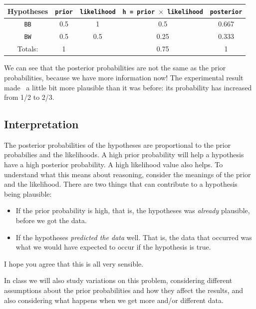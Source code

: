 \begin{table}[h!]
\begin{center}
\begin{tabular}{|c|c|c|c|c|}
\hline
{\bf Hypotheses} & {\tt prior} & {\tt likelihood} &
{\tt h = prior $\times$ likelihood} & {\tt posterior}\\
\hline
{\tt BB} & 0.5 & 1 & 0.5 & 0.667\\
{\tt BW} & 0.5 & 0.5 & 0.25  & 0.333\\
\hline
Totals: & 1 & & 0.75 & 1\\
\hline
\end{tabular}
\end{center}
\end{table}
We can see that the posterior probabilities are not the same as the prior
probabilities, because we have more information now! The experimental result
made \bb~a little bit more plausible than it was before: its probability has
increased from 1/2 to 2/3.

\subsection{Interpretation}
The posterior probabilities of the hypotheses are proportional to the prior probabilies
and the likelihoods. A high prior probability will help a hypothesis have a high
posterior probability. A high likelihood value also helps.
To understand what this means about reasoning, consider
the meanings of the prior and the likelihood. There are two things that can
contribute to a hypothesis being plausible:
\begin{itemize}
\item If the prior probability is high, that is, the hypotheses was {\it already}
plausible, before we got the data.
\item If the hypotheses {\it predicted the data} well. That is, the data that
occurred was what we would have expected to occur if the hypothesis is true.
\end{itemize}
I hope you agree that this is all very sensible.

In class we will also study
variations on this problem, considering different assumptions about the prior
probabilities and how they affect the results, and also considering what happens
when we get more and/or different data.

